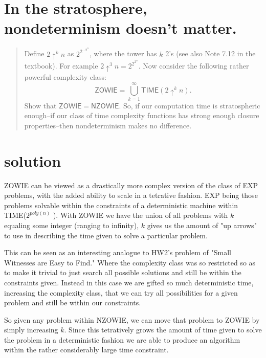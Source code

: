 

\maketitle
\thispagestyle{firststyle}
\vspace{-2.0cm}

\section*{In the stratosphere, nondeterminism doesn’t matter.}
    \begin{quote}
    Define $2\uparrow^k n$ as $2^{2^{...2^n}}$, where the tower has $k$ 2's (see also Note 7.12 in the textbook).
    For example $2 \uparrow^3 n = 2^{2^{2^n}}$.
    Now consider the following rather powerful complexity class:
    \[
        \mathsf{ZOWIE} =
        \bigcup_{k=1}^\infty \mathsf{TIME}(2\uparrow^k n).
    \]
    Show that $\mathsf{ZOWIE} = \mathsf{NZOWIE}$.
    So, if our computation time is stratospheric enough--if our class of time complexity functions has strong enough closure properties--then nondeterminism makes no difference.
    \end{quote}
    
\section*{solution}



ZOWIE can be viewed as a drastically more complex version of the class of EXP problems, with the added ability to scale in a tetrative fashion. EXP being those problems solvable within the constraints of a deterministic machine within TIME($2^{poly(n)}$ ). With ZOWIE we have the union of all problems with $k$ equaling some integer (ranging to infinity), $k$ gives us the amount of "up arrows" to use in describing the time given to solve a particular problem. 

This can be seen as an interesting analogue to HW2's problem of "Small Witnesses are Easy to Find." Where the complexity class was so restricted so as to make it trivial to just search all possible solutions and still be within the constraints given. Instead in this case we are gifted so much deterministic time, increasing the complexity class, that we can try all possibilities for a given problem and still be within our constraints. 

So given any problem within NZOWIE, we can move that problem to ZOWIE by simply increasing $k$. Since this tetratively grows the amount of time given to solve the problem in a deterministic fashion we are able to produce an algorithm within the rather considerably large time constraint.     
    
    
    

